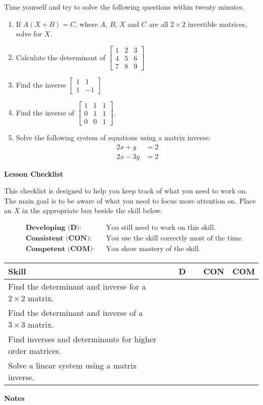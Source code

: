 \documentclass[10pt]{book}
\theoremstyle{definition}
\theoremstyle{remark}
\begin{document}
\begin{large}
\noindent
Time yourself and try to solve the following questions within twenty minutes. 
\begin{enumerate}
\item If $A(X+B)=C$, where $A$, $B$, $X$ and $C$ are all $2\times 2$ invertible matrices, solve for $X$. \vfil
\item Calculate the determinant of $\begin{bmatrix}  1&2&3\\4&5&6\\7&8&9 \end{bmatrix}$\vfil
\item Find the inverse $\begin{bmatrix} 1 & 1 \\ 1 & -1 \end{bmatrix}$\vfil
\item Find the inverse of $\begin{bmatrix}1&1&1\\0&1&1\\0&0&1 \end{bmatrix}$.\vfil
\item Solve the following system of equations using a matrix inverse: \begin{align*} 2x+y&=2\\2x-3y &=2 \end{align*}\vfil
\end{enumerate}

\noindent
\textbf{Lesson Checklist}
\bigskip

\noindent
This checklist is designed to help you keep track of what you need to work on. The main goal is to be aware of what you need to focus more attention on. Place an $X$ in the appropriate box beside the skill below. 
\bigskip

\noindent
\begin{align*}
&\textbf{Developing (D):} &&\textrm{You still need to work on this skill.}\\
&\textbf{Consistent (CON):} &&\textrm{You use the skill correctly most of the time.}\\
&\textbf{Competent (COM):} &&\textrm{You show mastery of the skill.} 
\end{align*}
\vfil

\begin{center}
\begin{tabular}{|l|l|l|l|}
\hline
\textbf{Skill} & \textbf{~~D~~} & \textbf{CON} & \textbf{COM} \\
\hline
Find the determinant and inverse for a $2\times 2$ matrix.&&&\\
\hline
Find the determinant and inverse of a $3\times 3$ matrix. &&&\\
\hline
Find inverses and determinants for higher order matrices.&&&\\
\hline
Solve a linear system using a matrix inverse.&&&\\
\hline
\end{tabular}
\end{center}
 \vfil

\noindent
\textbf{Notes}
\end{large} \vfil
\newpage
\end{document}
